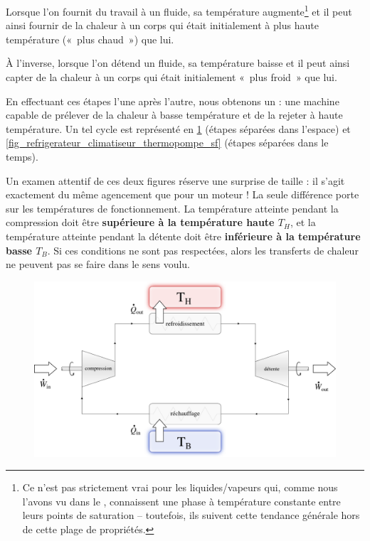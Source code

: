 			Lorsque l’on fournit du travail à un fluide, sa température augmente\footnote{Ce n’est pas strictement vrai pour les liquides/vapeurs qui, comme nous l’avons vu dans le \courscinq, connaissent une phase à température constante entre leurs points de saturation – toutefois, ils suivent cette tendance générale hors de cette plage de propriétés.} et il peut ainsi fournir de la chaleur à un corps qui était initialement à plus haute température («~plus chaud~») que lui.

			À l’inverse, lorsque l’on détend un fluide, sa température baisse et il peut ainsi capter de la chaleur à un corps qui était initialement «~plus froid~» que lui.

			En effectuant ces étapes l’une après l’autre, nous obtenons un  : une machine capable de prélever de la chaleur à basse température et de la rejeter à haute température. Un tel cycle est représenté en \cref{fig_refrigerateur_climatiseur_thermopompe_so} (étapes séparées dans l’espace) et \ref{fig_refrigerateur_climatiseur_thermopompe_sf} (étapes séparées dans le temps).
			
			Un examen attentif de ces deux figures réserve une surprise de taille : il s’agit exactement du même agencement que pour un moteur ! La seule différence porte sur les températures de fonctionnement. La température atteinte pendant la compression doit être \textbf{supérieure à la température haute $T_H$}, et la température atteinte pendant la détente doit être \textbf{inférieure à la température basse $T_B$}. Si ces conditions ne sont pas respectées, alors les transferts de chaleur ne peuvent pas se faire dans le sens voulu.
			
			\begin{figure}
				\begin{center}
					\includegraphics[width=\textwidth]{images/refrigerateur_climatiseur_thermopompe_so.png}
				\end{center}
				\label{fig_refrigerateur_climatiseur_thermopompe_so}
			\end{figure}

